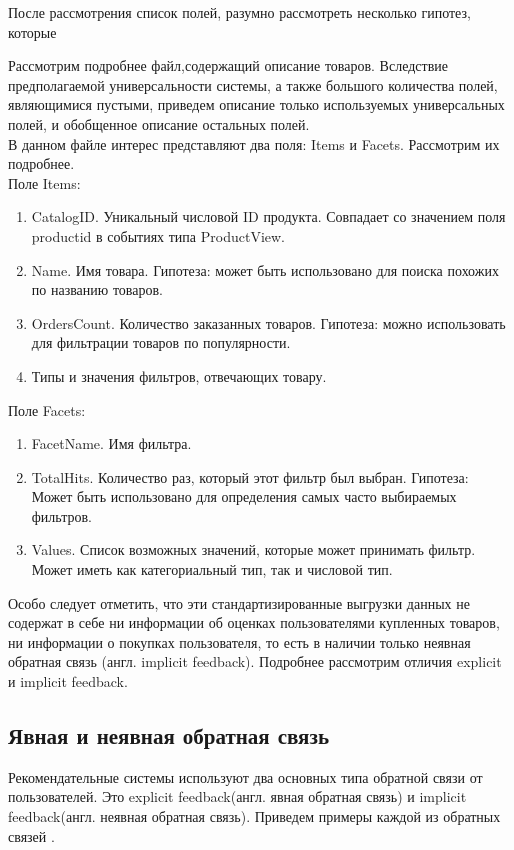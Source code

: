 \documentclass[14pt]{mmcs_article}
\newenvironment{myenumerate}
{ \begin{enumerate}
		\setlength{\itemsep}{0pt}
		\setlength{\parskip}{0pt}
		\setlength{\parsep}{0pt}     }
	{ \end{enumerate}                  }
\begin{document}
После рассмотрения список полей, разумно рассмотреть несколько гипотез, которые 

Рассмотрим подробнее файл,содержащий описание товаров. Вследствие предполагаемой универсальности системы, а также большого количества полей, являющимися пустыми, приведем описание только используемых универсальных полей, и обобщенное описание остальных полей.\\
В данном файле интерес представляют два поля: Items и Facets. Рассмотрим их подробнее. \\
Поле Items:
\begin{myenumerate}
	
	\item CatalogID. Уникальный числовой ID продукта. Совпадает со значением поля productid в событиях типа ProductView.
	\item Name. Имя товара. Гипотеза: может быть использовано для поиска похожих по названию товаров.
 	\item OrdersCount. Количество заказанных товаров. Гипотеза: можно использовать для фильтрации товаров по популярности.
	\item Типы и значения фильтров, отвечающих товару.
\end{myenumerate}
Поле Facets:
\begin{myenumerate}
	
	\item FacetName. Имя фильтра.
	\item TotalHits. Количество раз, который этот фильтр был выбран. Гипотеза: Может быть использовано для определения самых часто выбираемых фильтров.
	\item Values. Список возможных значений, которые может принимать фильтр. Может иметь как категориальный тип, так и числовой тип. 
\end{myenumerate}

Особо следует отметить, что эти стандартизированные выгрузки данных не содержат в себе ни информации об оценках пользователями купленных товаров, ни информации о покупках пользователя, то есть в наличии только неявная обратная связь (англ. implicit feedback). Подробнее рассмотрим отличия explicit и implicit feedback.

\subsection{Явная и неявная обратная связь}
Рекомендательные системы используют два основных типа обратной связи от пользователей. Это explicit feedback(англ. явная обратная связь) и implicit feedback(англ. неявная обратная связь). Приведем примеры каждой из обратных связей \cite{stud:kimfalk1}.
\end{document}
